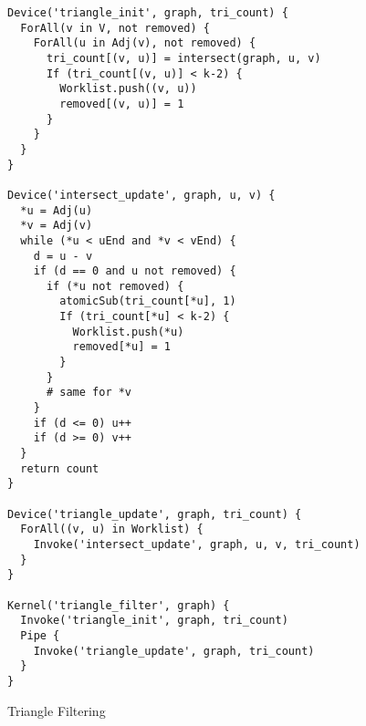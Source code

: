 \begin{listing}
\begin{verbatim}
Device('triangle_init', graph, tri_count) {
  ForAll(v in V, not removed) {
    ForAll(u in Adj(v), not removed) {
      tri_count[(v, u)] = intersect(graph, u, v)
      If (tri_count[(v, u)] < k-2) {
        Worklist.push((v, u))
        removed[(v, u)] = 1
      }
    }
  }
}

Device('intersect_update', graph, u, v) {
  *u = Adj(u)
  *v = Adj(v)
  while (*u < uEnd and *v < vEnd) {
    d = u - v
    if (d == 0 and u not removed) {
      if (*u not removed) {
        atomicSub(tri_count[*u], 1)
        If (tri_count[*u] < k-2) {
          Worklist.push(*u)
          removed[*u] = 1
        }
      }
      # same for *v
    }
    if (d <= 0) u++
    if (d >= 0) v++
  }
  return count
}

Device('triangle_update', graph, tri_count) {
  ForAll((v, u) in Worklist) {
    Invoke('intersect_update', graph, u, v, tri_count)
  }
}

Kernel('triangle_filter', graph) {
  Invoke('triangle_init', graph, tri_count)
  Pipe {
    Invoke('triangle_update', graph, tri_count)
  }
}
\end{verbatim}
\caption{Triangle Filtering}
\label{l:tri_filter}
\end{listing}
